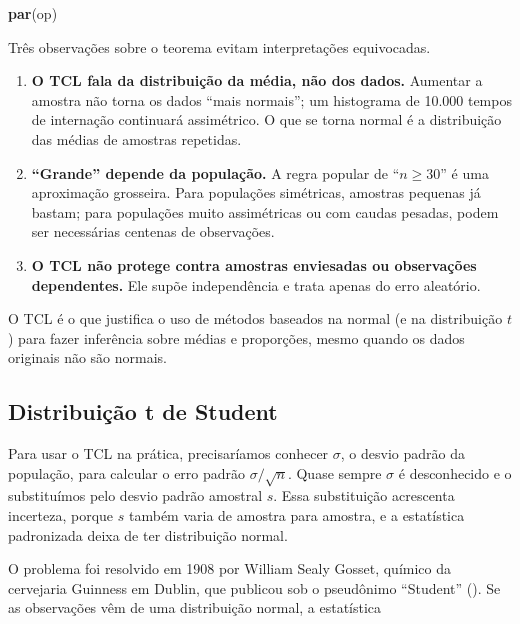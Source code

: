 \documentclass[
]{book}
\newenvironment{Shaded}{\begin{snugshade}}{\end{snugshade}}
\newcommand{\FunctionTok}[1]{\textcolor[rgb]{0.13,0.29,0.53}{\textbf{#1}}}
\newcommand{\NormalTok}[1]{#1}
\providecommand{\tightlist}{%
  \setlength{\itemsep}{0pt}\setlength{\parskip}{0pt}}
\begin{document}
\begin{Shaded}
\begin{Highlighting}[]
\FunctionTok{par}\NormalTok{(op)}
\end{Highlighting}
\end{Shaded}

Três observações sobre o teorema evitam interpretações equivocadas.

\begin{enumerate}
\def\labelenumi{\arabic{enumi}.}
\tightlist
\item
  \textbf{O TCL fala da distribuição da média, não dos dados.} Aumentar a amostra não torna os dados ``mais normais''; um histograma de 10.000 tempos de internação continuará assimétrico. O que se torna normal é a distribuição das médias de amostras repetidas.
\item
  \textbf{``Grande'' depende da população.} A regra popular de ``\(n \ge 30\)'' é uma aproximação grosseira. Para populações simétricas, amostras pequenas já bastam; para populações muito assimétricas ou com caudas pesadas, podem ser necessárias centenas de observações.
\item
  \textbf{O TCL não protege contra amostras enviesadas ou observações dependentes.} Ele supõe independência e trata apenas do erro aleatório.
\end{enumerate}

O TCL é o que justifica o uso de métodos baseados na normal (e na distribuição \(t\)) para fazer inferência sobre médias e proporções, mesmo quando os dados originais não são normais.

\subsection{Distribuição t de Student}\label{distribuiuxe7uxe3o-t-de-student}

Para usar o TCL na prática, precisaríamos conhecer \(\sigma\), o desvio padrão da população, para calcular o erro padrão \(\sigma/\sqrt{n}\). Quase sempre \(\sigma\) é desconhecido e o substituímos pelo desvio padrão amostral \(s\). Essa substituição acrescenta incerteza, porque \(s\) também varia de amostra para amostra, e a estatística padronizada deixa de ter distribuição normal.

O problema foi resolvido em 1908 por William Sealy Gosset, químico da cervejaria Guinness em Dublin, que publicou sob o pseudônimo ``Student'' (). Se as observações vêm de uma distribuição normal, a estatística
\end{document}
